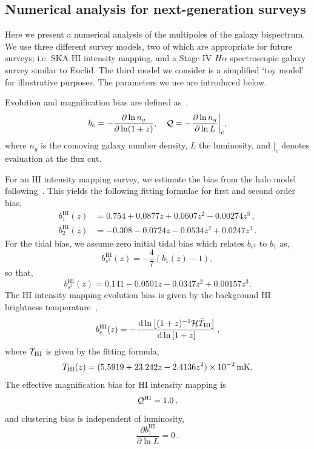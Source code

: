 {\subsection{Numerical analysis for next-generation surveys}

Here we present a numerical analysis of the multipoles of the galaxy bispectrum. We use three different survey models, two of which are appropriate for future surveys; i.e. SKA HI intensity mapping, and a Stage IV \(H\alpha\) spectroscopic galaxy survey similar to Euclid. The third model we consider is a simplified `toy model' for illustrative purposes. The parameters we use are introduced below. 

Evolution and magnification bias are defined as~\cite{Alonso:2015uua}, 
\begin{equation}\label{eq:beQdefs}
	b_e = - \frac{\partial \ln n_g}{\partial \ln(1+z)}, \quad \Q = - \evaluat*{\frac{\partial\ln n_g}{\partial \ln L}}_{c},
\end{equation}
where \(n_g\) is the comoving galaxy number density, \(L\) the luminosity, and \(|_c\) denotes evaluation at the flux cut. 

For an HI intensity mapping survey, we estimate the bias from the halo model following~\cite{Umeh:2015gza}.  
This yields the following fitting formulae for first and second order bias, 
\begin{align}
	b^{\mathrm{HI}}_1(z) &=    0.754 + 0.0877 z + 0.0607 z^2 - 0.00274 z^3 \,, \\ 
	b^{\mathrm{HI}}_2(z) &=  -0.308 - 0.0724 z - 0.0534 z^2 + 0.0247 z^3  \,.
\end{align}
For the tidal bias, we assume zero initial tidal bias which relates \(b_{s^2}\) to \(b_1\) as,
\begin{equation}
	b_{s^2}^{\mathrm{HI}}(z) = - \frac{4}{7} (b_1(z) -1),
\end{equation}
so that, 
\begin{equation}
	b_{s^2}^{\mathrm{HI}}(z) = 0.141 - 0.0501 z - 0.0347 z^2 + 0.00157 z^3.
\end{equation}
The HI intensity mapping evolution bias is given by the background HI brightness temperature~\cite{Fonseca:2018hsu},
\begin{equation}
	b_e^{\mathrm{HI}}(z) = - \frac{\,\mathrm{d} \ln \left[ (1+z)^{-1} \mathcal{H} \bar{T}_{\mathrm{HI}}\right]}{\,\mathrm{d} \ln\left[1+z \right]}\,,
\end{equation}
where \(\bar{T}_{\mathrm{HI}}\) is given by the fitting formula, 
\begin{equation}
	\bar{T}_{\mathrm{HI}}(z) = (5.5919 + 23.242  z - 2.4136  z^2)\times 10^{-2} \, \mathrm{mK}.
\end{equation}
The effective magnification bias for HI intensity mapping is~\cite{Fonseca:2018hsu}
\begin{equation}
	\mathcal{Q}^{\mathrm{HI}} = 1.0\,,
\end{equation}
and clustering bias is independent of luminosity, 
\begin{equation}
	\frac{\partial b_1^\mathrm{HI}}{\partial \ln L} = 0\,.
\end{equation}

}
